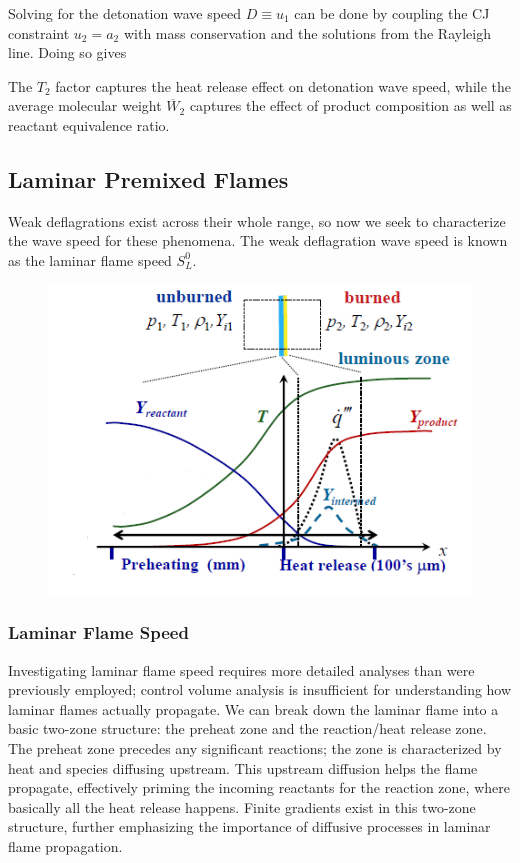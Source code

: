 \documentclass[11pt]{article}
\newcommand{\CenteredBoxed}[1]{\begin{center}\boxed{#1}\end{center}}
\begin{document}
Solving for the detonation wave speed $D\equiv u_1$ can be done by coupling the CJ constraint $u_2=a_2$ with mass conservation and the solutions from the Rayleigh line. Doing so gives
\CenteredBoxed{D=\frac{\gamma_2+1}{\gamma}\sqrt{\frac{\gamma_2T_2R_u}{\overline{W}_2}}}
The $T_2$ factor captures the heat release effect on detonation wave speed, while the average molecular weight $\overline{W}_2$ captures the effect of product composition as well as reactant equivalence ratio.

\subsection{Laminar Premixed Flames}
Weak deflagrations exist across their whole range, so now we seek to characterize the wave speed for these phenomena. The weak deflagration wave speed is known as the laminar flame speed $S_L^0$.
\begin{figure}[h]\centering\includegraphics[scale=0.8]{Graphics/laminar_flame_structure.png}\end{figure}

\subsubsection{Laminar Flame Speed}
Investigating laminar flame speed requires more detailed analyses than were previously employed; control volume analysis is insufficient for understanding how laminar flames actually propagate. We can break down the laminar flame into a basic two-zone structure: the preheat zone and the reaction/heat release zone. The preheat zone precedes any significant reactions; the zone is characterized by heat and species diffusing upstream. This upstream diffusion helps the flame propagate, effectively priming the incoming reactants for the reaction zone, where basically all the heat release happens. Finite gradients exist in this two-zone structure, further emphasizing the importance of diffusive processes in laminar flame propagation.\\
\end{document}
